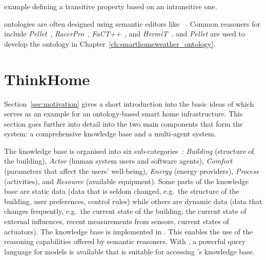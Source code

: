 \begin{mintlisting}

\caption[Example  rule]{ example defining a transitive property based on an intransitive one.}
\label{listing:swrl_example}
\end{mintlisting}

 ontologies are often designed using semantic editors like \protege~\cite{protege}. Common reasoners for  include \emph{Pellet}~\cite{pellet}, \emph{RacerPro}~\cite{RacerPro}, \emph{FaCT++}~\cite{factplusplus}, and \emph{HermiT}~\cite{hermit}. \protege and \emph{Pellet} are used to develop the \smarthomeweather ontology in Chapter~\ref{ch:smarthomeweather_ontology}.

\section{ThinkHome}

Section~\ref{sec:motivation} gives a short introduction into the basic ideas of \thinkhome which serves as an example for an ontology-based smart home infrastructure. This section goes further into detail into the two main components that form the \thinkhome system: a comprehensive knowledge base and a multi-agent system.

The knowledge base is organised into six sub-categories~\cite{CR2011-TH_Journal,CR2010-DEST_ThinkHome}: \emph{Building} (structure of the building), \emph{Actor} (human system users and software agents), \emph{Comfort} (parameters that affect the users' well-being), \emph{Energy} (energy providers), \emph{Process} (activities), and \emph{Resource} (available equipment). Some parts of the knowledge base are static data (data that is seldom changed, e.g.\ the structure of the building, user preferences, control rules) while others are dynamic data (data that changes frequently, e.g.\ the current state of the building, the current state of external influences, recent measurements from sensors, current states of actuators). The knowledge base is implemented in . This enables the use of the reasoning capabilities offered by semantic reasoners. With , a powerful query language for  models is available that is suitable for accessing \thinkhome's knowledge base.


